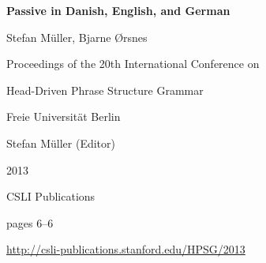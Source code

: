 \documentclass[a4paper,11pt]{article}
\begin{document}
\begin{center}
  {\huge\bf Passive in Danish, English, and German\par}

  \bigskip

  {\LARGE Stefan Müller, Bjarne Ørsnes\par}

  \vspace*{3\bigskipamount}

  Proceedings of the 20th International Conference on\par Head-Driven Phrase Structure Grammar

  \bigskip

  Freie Universität Berlin

  \medskip

  Stefan M{\"u}ller (Editor)

  \medskip

  2013

  \medskip

  CSLI Publications

  \medskip

  pages 6--6

  \medskip

  \url{http://csli-publications.stanford.edu/HPSG/2013}
\end{center}

\newpage

        
\end{document}
